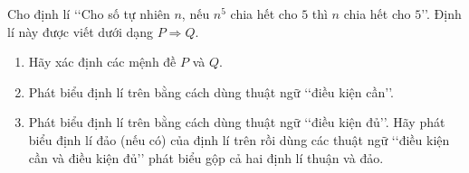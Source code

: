 \begin{bt}
	Cho định lí \lq\lq Cho số tự nhiên $n$, nếu $n^5$ chia hết cho $5$ thì $n$ chia hết cho $5$\rq\rq. Định lí này được viết dưới dạng $P\Rightarrow Q$.
	\begin{enumerate}
		\item Hãy xác định các mệnh đề $P$ và $Q$.
		\item Phát biểu định lí trên bằng cách dùng thuật ngữ \lq\lq điều kiện cần\rq\rq.
		\item Phát biểu định lí trên bằng cách dùng thuật ngữ \lq\lq điều kiện đủ\rq\rq.
		Hãy phát biểu định lí đảo (nếu có) của định lí trên rồi dùng các thuật ngữ \lq\lq điều kiện cần và điều kiện đủ\rq\rq\text{} phát biểu gộp cả hai định lí thuận và đảo.
	\end{enumerate}
\end{bt}

